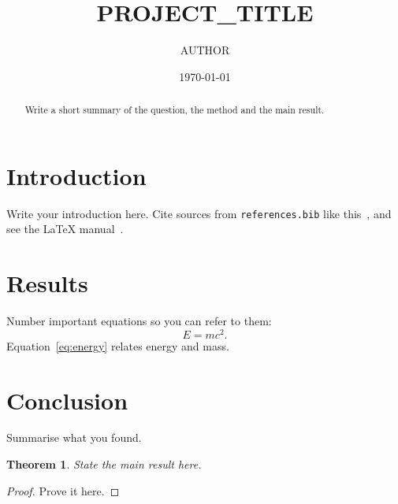\documentclass{amsart}
\newtheorem{theorem}{Theorem}[section]
\theoremstyle{definition}
\begin{document}
\title{{{PROJECT_TITLE}}}
\author{{{AUTHOR}}}
\address{Department, University, City, Country}
\date{\today}

\begin{abstract}
Write a short summary of the question, the method and the main result.
\end{abstract}

\maketitle

\section{Introduction}
Write your introduction here. Cite sources from \texttt{references.bib} like
this~\cite{einstein1905}, and see the \LaTeX{} manual~\cite{lamport1994}.

\section{Results}
Number important equations so you can refer to them:
\begin{equation}
  E = mc^2 . \label{eq:energy}
\end{equation}
Equation~\eqref{eq:energy} relates energy and mass.

\section{Conclusion}
Summarise what you found.

\begin{theorem}\label{thm:main}
State the main result here.
\end{theorem}

\begin{proof}
Prove it here.
\end{proof}



\end{document}
